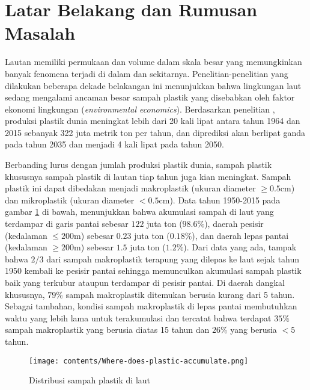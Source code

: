 \vspace{1.5pc}
\section[Latar Belakang dan Rumusan Masalah]{Latar Belakang dan Rumusan Masalah}
\begin{spacing}{1.5}
	Lautan memiliki permukaan dan volume dalam skala besar yang memungkinkan banyak fenomena terjadi di dalam dan sekitarnya. Penelitian-penelitian yang dilakukan beberapa dekade belakangan ini menunjukkan bahwa lingkungan laut sedang mengalami ancaman besar sampah plastik yang disebabkan oleh faktor ekonomi lingkungan (\textit{environmental economics}). Berdasarkan penelitian , produksi plastik dunia meningkat lebih dari 20 kali lipat antara tahun 1964 dan 2015 sebanyak 322 juta metrik ton per tahun, dan diprediksi akan berlipat ganda pada tahun 2035 dan menjadi 4 kali lipat pada tahun 2050. \par 
	Berbanding lurus dengan jumlah produksi plastik dunia, sampah plastik khususnya sampah plastik di lautan tiap tahun juga kian meningkat. Sampah plastik ini dapat dibedakan menjadi makroplastik (ukuran diameter $\geq 0.5$cm) dan mikroplastik (ukuran diameter $<0.5$cm). Data tahun 1950-2015  pada gambar \ref{fig:plasticdata} di bawah, menunjukkan bahwa akumulasi sampah di laut yang terdampar di garis pantai sebesar $122$ juta ton ($98.6\%$), daerah pesisir (kedalaman $\leq 200$m) sebesar $0.23$ juta ton ($0.18\%$), dan daerah lepas pantai (kedalaman $\geq 200$m) sebesar $1.5$ juta ton ($1.2\%$). Dari data yang ada, tampak bahwa $2/3$ dari sampah makroplastik terapung yang dilepas ke laut sejak tahun 1950 kembali ke pesisir pantai sehingga memunculkan akumulasi sampah plastik baik yang terkubur ataupun terdampar di pesisir pantai. Di daerah dangkal khususnya, $79\%$ sampah makroplastik ditemukan berusia kurang dari 5 tahun. Sebagai tambahan, kondisi sampah makroplastik di lepas pantai membutuhkan waktu yang lebih lama untuk terakumulasi dan tercatat bahwa terdapat $35\%$ sampah makroplastik yang berusia diatas 15 tahun dan $26\%$ yang berusia $<5$ tahun.
	
	\begin{figure}[H]
		\centering
		\texttt{[image: contents/Where-does-plastic-accumulate.png]}
		\caption{Distribusi sampah plastik di laut \protect{}}
		\label{fig:plasticdata}
	\end{figure}


\end{spacing}
